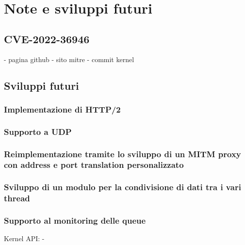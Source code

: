 \chapter{Note e sviluppi futuri}

\section{CVE-2022-36946}

- pagina github
- sito mitre
- commit kernel

\section{Sviluppi futuri}

\subsection{Implementazione di HTTP/2}

\subsection{Supporto a UDP}

\subsection{Reimplementazione tramite lo sviluppo di un MITM proxy con address e port translation personalizzato}

\subsection{Sviluppo di un modulo per la condivisione di dati tra i vari thread}

\subsection{Supporto al monitoring delle queue}

Kernel API:
- 
